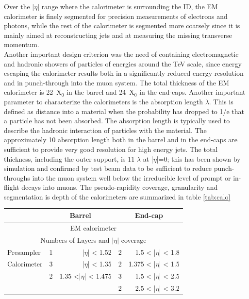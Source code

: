 Over the |$\eta$| range where the calorimeter is surrounding the ID, the EM calorimeter is finely segmented for precision measurements of electrons and photons, while the rest of the calorimeter is segmented more coarsely since it is mainly aimed at reconstructing jets and at measuring the missing transverse momentum.\\
Another important design criterion was the need of containing electromagnetic and hadronic showers of particles of energies around the TeV scale, since energy escaping the calorimeter results both in a significantly reduced energy resolution and in punch-through into the muon system. The total thickness of the EM calorimeter is 22~X$_0$ in the barrel and 24~X$_0$ in the end-caps.
Another important parameter to characterize the calorimeters is the absorption length $\lambda$. This is defined as distance into a material when the probability has dropped to 1/e that a particle has not been absorbed. The absorption length is typically used to describe the hadronic interaction of particles with the material.
The approximately 10 absorption length both in the barrel and in the end-caps are sufficient to provide very good resolution for high energy jets. The total thickness, including the outer support, is 11 $\lambda$ at |$\eta$|=0; this has been shown by simulation and confirmed by test beam data to be sufficient to reduce punch-throughs into the muon system well below the irreducible level of prompt or in-flight decays into muons.
The pseudo-rapidity coverage, granularity and segmentation is depth of the calorimeters are summarized in table \ref{tab:calo}

\begin{table}
\center
\begin{tabular}{l|lr|lr}
\hline
																			& \multicolumn{2}{c}{Barrel} 											& \multicolumn{2}{c}{End-cap}	\\ %
\hline
\multicolumn{5}{c}{\tiny{EM calorimeter}} \\
\hline
\multicolumn{5}{c}{\tiny{Numbers of Layers and $|\eta|$ coverage}} \\
\hline
Presampler 													& 1 & |$\eta$| < 1.52& 2 & 1.5 < |$\eta$| < 1.8 \\
\hline
Calorimeter 												& 3 & |$\eta$| < 1.35& 2 & 1.375 < |$\eta$| < 1.5 \\
					 													& 2 & 1.35 <|$\eta$| < 1.475 & 3 & 1.5 < |$\eta$| < 2.5 \\
					 													&		&												& 2 & 2.5 < |$\eta$| < 3.2 \\
\hline
\end{tabular}
\end{table}


